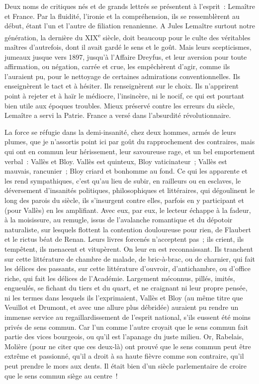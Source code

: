 \documentclass[french,twoside]{book} %
\begin{document}
Deux noms de critiques nés et de grands lettrés se présentent à l’esprit : Lemaître et France. Par la fluidité, l’ironie et la compréhension, ils se ressemblèrent au début, étant l’un et l’autre de filiation renanienne. A Jules Lemaître surtout notre génération, la dernière du XIX\textsuperscript{e} siècle, doit beaucoup pour le culte des véritables maîtres d’autrefois, dont il avait gardé le sens et le goût. Mais leurs scepticismes, jumeaux jusque vers 1897, jusqu’à l’Affaire Dreyfus, et leur aversion pour toute affirmation, ou négation, carrée et crue, les empêchèrent d’agir, comme ils l’auraient pu, pour le nettoyage de certaines admirations conventionnelles. Ils enseignèrent le tact et à hésiter. Ils renseignèrent sur le choix. Ils n’apprirent point à rejeter et à haïr le médiocre, l’insincère, ni le nocif, ce qui est pourtant bien utile aux époques troubles. Mieux préservé contre les erreurs du siècle, Lemaître a servi la Patrie. France a versé dans l’absurdité révolutionnaire.\par
La force se réfugie dans la demi-insanité, chez deux hommes, armés de leurs plumes, que je n’assortis point ici par goût du rapprochement des contraires, mais qui ont en commun leur hérissement, leur savoureuse rage, et un bel emportement verbal : Vallès et Bloy. Vallès est quinteux, Bloy vaticinateur ; Vallès est mauvais, rancunier ; Bloy criard et bonhomme au fond. Ce qui les apparente et les rend sympathiques, c’est qu’au lieu de subir, en railleurs ou en esclaves, le déversement d’insanités politiques, philosophiques et littéraires, qui dégoulinent le long des parois du siècle, ils s’insurgent contre elles, parfois en y participant et (pour Vallès) en les amplifiant. Avec eux, par eux, le lecteur échappe à la fadeur, à la moisissure, au remugle, issus de l’avalanche romantique et du dépotoir naturaliste, sur lesquels flottent la contention douloureuse pour rien, de Flaubert et le rictus béat de Renan. Leurs livres forcenés n’acceptent pas ; ils crient, ils tempêtent, ils menacent et vitupèrent. On leur en est reconnaissant. Ils tranchent sur cette littérature de chambre de malade, de bric-à-brac, ou de charnier, qui fait les délices des passants, sur cette littérature d’ouvroir, d’antichambre, ou d’office riche, qui fait les délices de l’Académie. Largement méconnus, pillés, imités, engueulés, se fichant du tiers et du quart, et ne craignant ni leur propre pensée, ni les termes dans lesquels ils l’exprimaient, Vallès et Bloy (au même titre que Veuillot et Drumont, et avec une allure plus débridée) auraient pu rendre un immense service au regaillardissement de l’esprit national, s’ils eussent été moins privés de sens commun. Car l’un comme l’autre croyait que le sens commun fait partie des vices bourgeois, ou qu’il est l’apanage du juste milieu. Or, Rabelais, Molière (pour ne citer que ces deux-là) ont prouvé que le sens commun peut être extrême et passionné, qu’il a droit à sa haute fièvre comme son contraire, qu’il peut prendre le mors aux dents. Il était bien d’un siècle parlementaire de croire que le sens commun siège au centre !\par
\end{document}
